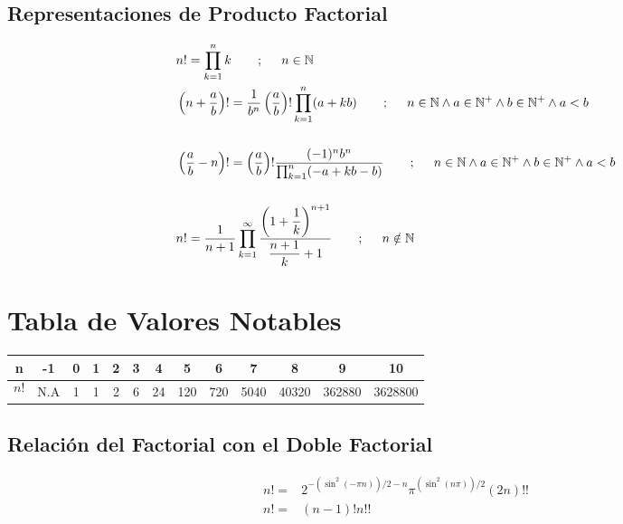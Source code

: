 \subsection{Representaciones de Producto Factorial}
\begin{align*}
	 & n!=\prod_{k=1}^{n} k \hspace{.5cm} \ \ ; \hspace{.5cm} n\in\mathbb{N}                                                                                                                                                          \\
	 & \left( n+\dfrac{a}{b}\right) !=\dfrac{1}{b^n} \left(\dfrac{a}{b} \right)! \prod_{k=1}^{n} (a+kb) \hspace{0.5cm}\ \ ; \hspace{.5cm} n\in\mathbb{N} \wedge a \in\mathbb{N}^+ \wedge b \in\mathbb{N}^+ \wedge a<b
	\\
	 &
	\\
	 & \left( \dfrac{a}{b}-n\right) != \left(\dfrac{a}{b} \right)! \dfrac{(-1)^n  b^n}{ \prod_{k=1}^{n} (-a+kb-b)  }    \hspace{0.5cm}\ \ ; \hspace{.5cm} n\in\mathbb{N} \wedge a \in\mathbb{N}^+ \wedge b \in\mathbb{N}^+ \wedge a<b
	\\
	 &
	\\
	 & n!= \dfrac{1}{n+1}\prod_{k=1}^{\infty} \dfrac{\left(1+\dfrac{1}{k} \right)^{n+1} }{\dfrac{n+1}{k}+1} \hspace{0.5cm}\ \ ; \hspace{.5cm} n \notin \mathbb{N}
\end{align*}

\section{Tabla de Valores Notables}

\begin{tabular}{|c|c|c|c|c|c|c|c|c|c|c|c|c|}
	\hline
	n       & -1  & 0 & 1 & 2 & 3 & 4  & 5   & 6   & 7    & 8     & 9      & 10      \\
	\hline
	$$ n!$$ & N.A & 1 & 1 & 2 & 6 & 24 & 120 & 720 & 5040 & 40320 & 362880 & 3628800 \\
	\hline
\end{tabular}

\subsection{Relación del Factorial con el Doble Factorial}
\begin{align*}
	n!= & 2^{-(\sin^2(-\pi n))/2-n} \pi^{(\sin^2(n\pi))/2} (2n)!! \\
	n!= & (n-1)! n!!
\end{align*}


